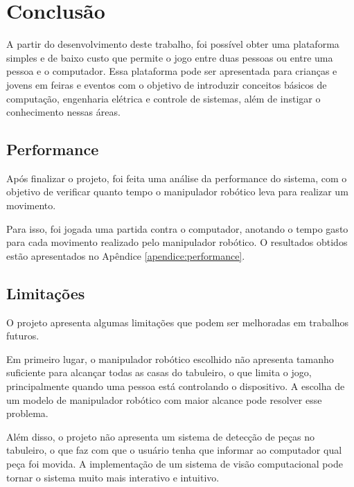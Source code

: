 \chapter[Conclusão]{Conclusão}
\label{cap:conclusao}

A partir do desenvolvimento deste trabalho, foi possível obter uma plataforma simples e de baixo custo que permite o jogo entre duas pessoas ou entre uma pessoa e o computador.
Essa plataforma pode ser apresentada para crianças e jovens em feiras e eventos com o objetivo de introduzir conceitos básicos de computação, engenharia elétrica e controle de sistemas, além de instigar o conhecimento nessas áreas.

\section[Performance]{Performance}
\label{sec:performance}

Após finalizar o projeto, foi feita uma análise da performance do sistema,
com o objetivo de verificar quanto tempo o manipulador robótico leva para realizar um movimento.

Para isso, foi jogada uma partida contra o computador, anotando o tempo gasto para cada movimento realizado pelo manipulador robótico.
O resultados obtidos estão apresentados no Apêndice \ref{apendice:performance}.

\section[Limitações]{Limitações}
\label{sec:limitacoes}

O projeto apresenta algumas limitações que podem ser melhoradas em trabalhos futuros.

Em primeiro lugar, o manipulador robótico escolhido não apresenta tamanho suficiente para alcançar todas as casas do tabuleiro,
o que limita o jogo, principalmente quando uma pessoa está controlando o dispositivo.
A escolha de um modelo de manipulador robótico com maior alcance pode resolver esse problema.

Além disso, o projeto não apresenta um sistema de detecção de peças no tabuleiro,
o que faz com que o usuário tenha que informar ao computador qual peça foi movida.
A implementação de um sistema de visão computacional pode tornar o sistema muito mais interativo e intuitivo.